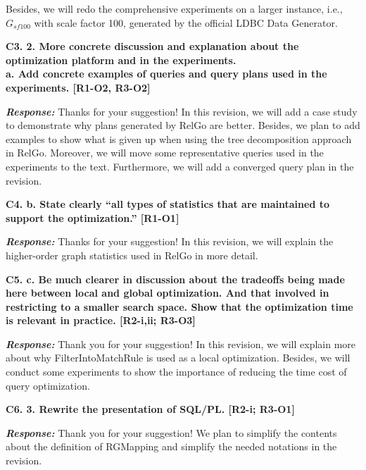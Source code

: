 Besides, we will redo the comprehensive experiments on a larger instance, i.e., $G_{sf100}$ with scale factor 100, generated by the official LDBC Data Generator.


\textbf{
C3. 2. More concrete discussion and explanation about the optimization platform and in the experiments. \\
a. Add concrete examples of queries and query plans used in the experiments. [R1-O2, R3-O2]
}

\textbf{\textit{Response: }}
Thanks for your suggestion! In this revision, we will add a case study to demonstrate why plans generated by RelGo are better.
Besides, we plan to add examples to show what is given up when using the tree decomposition approach in RelGo.
Moreover, we will move some representative queries used in the experiments to the text.
Furthermore, we will add a converged query plan in the revision.

\textbf{
C4. b. State clearly “all types of statistics that are maintained to support the optimization.” [R1-O1]}

\textbf{\textit{Response: }}
Thanks for your suggestion! In this revision, we will explain the higher-order graph statistics used in RelGo in more detail.


\textbf{
C5. c. Be much clearer in discussion about the tradeoffs being made here between local and global optimization. And that involved in restricting to a smaller search space. Show that the optimization time is relevant in practice. [R2-i,ii; R3-O3]}

\textbf{\textit{Response: }}
Thank you for your suggestion! In this revision, we will explain more about why FilterIntoMatchRule is used as a local optimization. 
Besides, we will conduct some experiments to show the importance of reducing the time cost of query optimization.


\textbf{
C6. 3. Rewrite the presentation of SQL/PL. [R2-i; R3-O1]
}

\textbf{\textit{Response: }}
Thank you for your suggestion! We plan to simplify the contents about the definition of RGMapping and simplify the needed notations in the revision.

